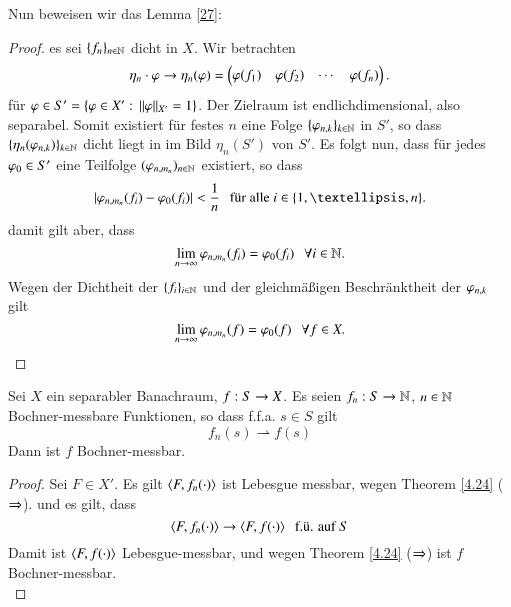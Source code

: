 Nun beweisen wir das Lemma \ref{27}:
\begin{proof}
    es sei $\{f_n\}_{n\in\mathbb{N}}$ dicht in $X$. Wir betrachten
    \[
        \eta_n\cdot \varphi \rightarrow \eta_n(\varphi)= \begin{pmatrix} \varphi(f_1)& \varphi(f_2)& \cdots & \varphi(f_n)\end{pmatrix}.
    \]
    für $\varphi \in S'=\{\varphi\in X': \, \|\varphi\|_{X'}=1\}$. Der Zielraum ist endlichdimensional,
    also separabel. Somit existiert für festes $n$ eine Folge $\{\varphi_{n,k}\}_{k\in\mathbb{N}}$ in $S'$, so dass
    $\{\eta_n(\varphi_{n,k})\}_{k\in \mathbb{N}}$ dicht liegt in im Bild $\eta_n(S')$ von $S'$. Es folgt nun,
    dass für jedes $\varphi _0\in S'$ eine Teilfolge $(\varphi_{n,m_n})_{n\in\mathbb{N}}$ existiert, so dass
    \[
        |\vp_{n,m_n}(f_i)-\vp_0(f_i)|< \frac1n \qq \text{für alle } i\in \{1,…,n\}.
    \]
    damit gilt aber, dass
    \[
        \lim_{n\rightarrow \infty} \varphi_{n,m_n}(f_i) = \varphi_0(f_i) \hspace{.25cm} \forall i \in \mathbb{N}.
    \]
    Wegen der Dichtheit der $\{f_i\}_{i\in\mathbb{N}}$ und der gleichmäßigen Beschränktheit der $\varphi_{n,k}$ gilt
    \[
        \lim_{n\rightarrow \infty} \varphi_{n,m_n}(f)= \varphi _0(f) \hspace{.25cm} \forall f\in X.
    \]
\end{proof}

\begin{cor}\label{4.25}
    Sei $X$ ein separabler Banachraum, $f:S\rightarrow X$. Es seien $f_n: S\rightarrow \mathbb{N}$, $n\in\mathbb{N}$ Bochner-messbare
    Funktionen, so dass f.f.a. $s\in S$ gilt
    \[
        f_n(s)\rightharpoonup f(s)
    \]
    Dann ist $f$ Bochner-messbar.
\end{cor}

\begin{proof}
    Sei $F\in X'$. Es gilt $\langle F,f_n(\cdot)\rangle$ ist Lebesgue messbar, wegen Theorem \ref{4.24}
    ($\Rightarrow$). und es gilt, dass
    \[
        \langle F,f_n (\cdot)\rangle \rightarrow \langle F,f(\cdot)\rangle \hspace{.25cm} \text{f.ü. auf } S
    \]
    Damit ist $\langle F,f(\cdot)\rangle$ Lebesgue-messbar, und wegen Theorem \ref{4.24} ($\Rightarrow$) ist $f$
    Bochner-messbar.
    \[ \]
\end{proof}
